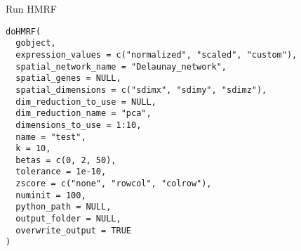 \documentclass[a4paper]{book}
\begin{document}
%
\begin{Description}\relax
Run HMRF
\end{Description}
%
\begin{Usage}
\begin{verbatim}
doHMRF(
  gobject,
  expression_values = c("normalized", "scaled", "custom"),
  spatial_network_name = "Delaunay_network",
  spatial_genes = NULL,
  spatial_dimensions = c("sdimx", "sdimy", "sdimz"),
  dim_reduction_to_use = NULL,
  dim_reduction_name = "pca",
  dimensions_to_use = 1:10,
  name = "test",
  k = 10,
  betas = c(0, 2, 50),
  tolerance = 1e-10,
  zscore = c("none", "rowcol", "colrow"),
  numinit = 100,
  python_path = NULL,
  output_folder = NULL,
  overwrite_output = TRUE
)
\end{verbatim}
\end{Usage}
%
\end{document}
